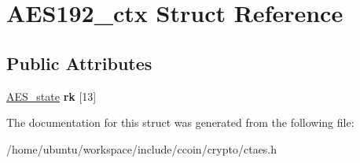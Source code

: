 \hypertarget{structAES192__ctx}{\section{A\-E\-S192\-\_\-ctx Struct Reference}
\label{structAES192__ctx}
}
\subsection*{Public Attributes}
\begin{DoxyCompactItemize}
\item 
\hypertarget{structAES192__ctx_a4cb89d8d8c4477bfdca2d115b2ebae97}{\hyperlink{structAES__state}{A\-E\-S\-\_\-state} {\bfseries rk} \mbox{[}13\mbox{]}}\label{structAES192__ctx_a4cb89d8d8c4477bfdca2d115b2ebae97}

\end{DoxyCompactItemize}


The documentation for this struct was generated from the following file\-:\begin{DoxyCompactItemize}
\item 
/home/ubuntu/workspace/include/ccoin/crypto/ctaes.\-h\end{DoxyCompactItemize}
